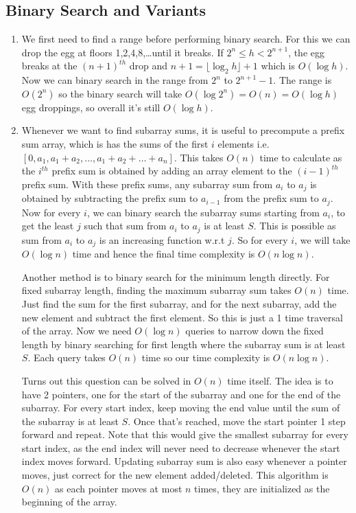 \documentclass[12pt]{report}
\begin{document}
\subsection*{\Huge\bfseries Binary Search and Variants}
\begin{enumerate}[label=\textbf{\arabic*.}]

  \item We first need to find a range before performing binary search. For this we can drop the egg at 
  floors 1,2,4,8,\dots until it breaks. If $2^n \leq h < 2^{n+1}$, the egg breaks at the $(n+1)^{th}$
  drop and $n+1 = \lfloor \log_2 h \rfloor + 1$ which is $O(\log h)$. Now we can binary search in the range from
  $2^n$ to $2^{n+1}-1$. The range is $O(2^n)$ so the binary search will take $O(\log 2^n) = O(n) = O(\log h)$
  egg droppings, so overall it's still $O(\log h)$.

  \item Whenever we want to find subarray sums, it is useful to precompute a prefix sum array, which is
  has the sums of the first $i$ elements i.e. $[0, a_1, a_1+a_2, \dots, a_1+a_2+\dots+a_n]$. This takes 
  $O(n)$ time to calculate as the $i^{th}$ prefix sum is obtained by adding an array element to the $(i-1)^{th}$
  prefix sum. With these prefix sums, any subarray sum from $a_i$ to $a_j$ is obtained by subtracting the prefix
  sum to $a_{i-1}$ from the prefix sum to $a_j$. Now for every $i$, we can binary search the subarray sums
  starting from $a_i$, to get the least $j$ such that sum from $a_i$ to $a_j$ is at least $S$. This is 
  possible as sum from $a_i$ to $a_j$ is an increasing function w.r.t $j$. So for every $i$, we will take
  $O(\log n)$ time and hence the final time complexity is $O(n \log n)$.

  Another method is to binary search for the minimum length directly. For fixed subarray length, finding the
  maximum subarray sum takes $O(n)$ time. Just find the sum for the first subarray, and for the next subarray,
  add the new element and subtract the first element. So this is just a 1 time traversal of the array. Now we 
  need $O(\log n)$ queries to narrow down the fixed length by binary searching for first length where the subarray
  sum is at least $S$. Each query takes $O(n)$ time so our time complexity is $O(n \log n)$.

  Turns out this question can be solved in $O(n)$ time itself. The idea is to have 2 pointers, one for the start 
  of the subarray and one for the end of the subarray. For every start index, keep moving the end value until 
  the sum of the subarray is at least $S$. Once that's reached, move the start pointer 1 step forward and repeat. Note that 
  this would give the smallest subarray for every start index, as the end index will never need to decrease whenever 
  the start index moves forward. Updating subarray sum is also easy whenever a pointer moves, just correct for
  the new element added/deleted. This algorithm is $O(n)$ as each pointer moves at most $n$ times, they are initialized as 
  the beginning of the array.


\end{enumerate}
\end{document}
